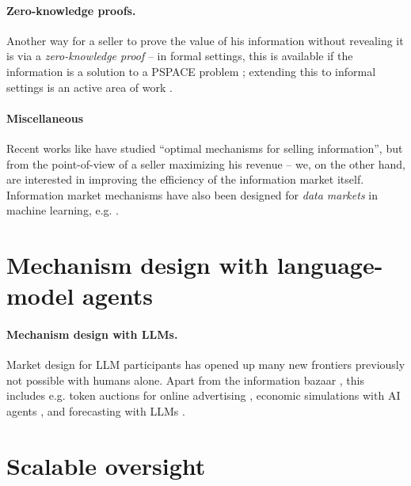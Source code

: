 \paragraph{Zero-knowledge proofs.} Another way for a seller to prove the value of his information without revealing it is via a \emph{zero-knowledge proof}  -- in formal settings, this is available if the information is a solution to a PSPACE problem ; extending this to informal settings is an active area of work .

\paragraph{Miscellaneous} Recent works like  have studied ``optimal mechanisms for selling information'', but from the point-of-view of a seller maximizing his revenue -- we, on the other hand, are interested in improving the efficiency of the information market itself. Information market mechanisms have also been designed for \emph{data markets} in machine learning, e.g. .

\section{Mechanism design with language-model agents}\label{litrev:sec:llm-mechanisms}
\paragraph{Mechanism design with LLMs.} Market design for LLM participants has opened up many new frontiers previously not possible with humans alone. Apart from the information bazaar , this includes e.g. token auctions for online advertising , economic simulations with AI agents , and forecasting with LLMs .

\section{Scalable oversight}\label{litrev:sec:oversight}
\label{solib:sec:related}
